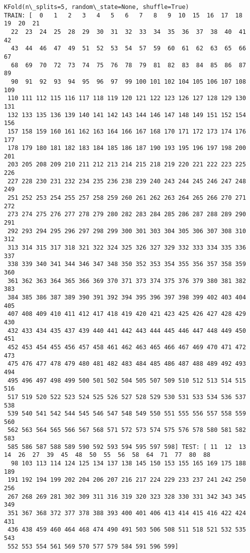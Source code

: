 \documentclass[11pt]{article}
\begin{document}
    \begin{Verbatim}[commandchars=\\\{\}]
KFold(n\_splits=5, random\_state=None, shuffle=True)
TRAIN: [  0   1   2   3   4   5   6   7   8   9  10  15  16  17  18  19  20  21
  22  23  24  25  28  29  30  31  32  33  34  35  36  37  38  40  41  42
  43  44  46  47  49  51  52  53  54  57  59  60  61  62  63  65  66  67
  68  69  70  72  73  74  75  76  78  79  81  82  83  84  85  86  87  89
  90  91  92  93  94  95  96  97  99 100 101 102 104 105 106 107 108 109
 110 111 112 115 116 117 118 119 120 121 122 123 126 127 128 129 130 131
 132 133 135 136 139 140 141 142 143 144 146 147 148 149 151 152 154 156
 157 158 159 160 161 162 163 164 166 167 168 170 171 172 173 174 176 177
 178 179 180 181 182 183 184 185 186 187 190 193 195 196 197 198 200 201
 203 205 208 209 210 211 212 213 214 215 218 219 220 221 222 223 225 226
 227 228 230 231 232 234 235 236 238 239 240 243 244 245 246 247 248 249
 251 252 253 254 255 257 258 259 260 261 262 263 264 265 266 270 271 272
 273 274 275 276 277 278 279 280 282 283 284 285 286 287 288 289 290 291
 292 293 294 295 296 297 298 299 300 301 303 304 305 306 307 308 310 312
 313 314 315 317 318 321 322 324 325 326 327 329 332 333 334 335 336 337
 338 339 340 341 344 346 347 348 350 352 353 354 355 356 357 358 359 360
 361 362 363 364 365 366 369 370 371 373 374 375 376 379 380 381 382 383
 384 385 386 387 389 390 391 392 394 395 396 397 398 399 402 403 404 405
 407 408 409 410 411 412 417 418 419 420 421 423 425 426 427 428 429 430
 432 433 434 435 437 439 440 441 442 443 444 445 446 447 448 449 450 451
 452 453 454 455 456 457 458 461 462 463 465 466 467 469 470 471 472 473
 475 476 477 478 479 480 481 482 483 484 485 486 487 488 489 492 493 494
 495 496 497 498 499 500 501 502 504 505 507 509 510 512 513 514 515 516
 517 519 520 522 523 524 525 526 527 528 529 530 531 533 534 536 537 538
 539 540 541 542 544 545 546 547 548 549 550 551 555 556 557 558 559 560
 562 563 564 565 566 567 568 571 572 573 574 575 576 578 580 581 582 583
 585 586 587 588 589 590 592 593 594 595 597 598] TEST: [ 11  12  13  14  26  27  39  45  48  50  55  56  58  64  71  77  80  88
  98 103 113 114 124 125 134 137 138 145 150 153 155 165 169 175 188 189
 191 192 194 199 202 204 206 207 216 217 224 229 233 237 241 242 250 256
 267 268 269 281 302 309 311 316 319 320 323 328 330 331 342 343 345 349
 351 367 368 372 377 378 388 393 400 401 406 413 414 415 416 422 424 431
 436 438 459 460 464 468 474 490 491 503 506 508 511 518 521 532 535 543
 552 553 554 561 569 570 577 579 584 591 596 599]

\end{Verbatim}
\end{document}
